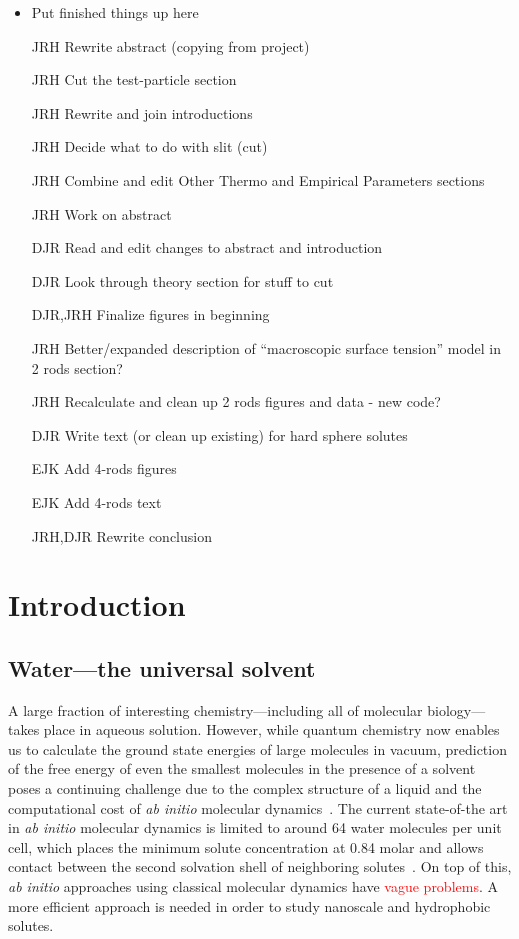 \documentclass[letterpaper,twocolumn,amsmath,amssymb,prb]{revtex4-1}
\begin{document}
{\begin{itemize}
\color{blue}
\item Put finished things up here
\item[JRH] Rewrite abstract (copying from project)
\item[JRH] Cut the test-particle section
\item[JRH] Rewrite and join introductions
\item[JRH] Decide what to do with slit (cut)
\item[JRH] Combine and edit Other Thermo and Empirical Parameters sections
\color{red}
\item[JRH] Work on abstract
\item[DJR] Read and edit changes to abstract and introduction
\item[DJR] Look through theory section for stuff to cut
\item[DJR,JRH] Finalize figures in beginning
\item[JRH] Better/expanded description of ``macroscopic surface tension'' model in 2 rods section?
\item[JRH] Recalculate and clean up 2 rods figures and data - new code?
\item[DJR] Write text (or clean up existing) for hard sphere solutes
\item[EJK] Add 4-rods figures
\item[EJK] Add 4-rods text
\item[JRH,DJR] Rewrite conclusion
\end{itemize}
}


\section{Introduction}

\subsection{Water---the universal solvent}

A large fraction of interesting chemistry---including all of molecular
biology---takes place in aqueous solution.  However, while quantum
chemistry now enables us to calculate the ground state energies of
large molecules in vacuum, prediction of the free energy of even the
smallest molecules in the presence of a solvent poses a continuing
challenge due to the complex structure of a liquid and the
computational cost of \emph{ab initio} molecular
dynamics~\cite{car1985, grossman2004}.  The current state-of-the art
in \emph{ab initio} molecular dynamics is limited to around 64 water
molecules per unit cell, which places the minimum solute concentration
at 0.84 molar and allows contact between the second solvation shell of
neighboring solutes~\cite{izvekov2005, choe2007}.  On top of this,
\emph{ab initio} approaches using classical molecular dynamics have
\textcolor{red}{vague problems}\cite{weber2010ab-initio-water}.  A
more efficient approach is needed in order to study nanoscale and
hydrophobic solutes.
\end{document}
